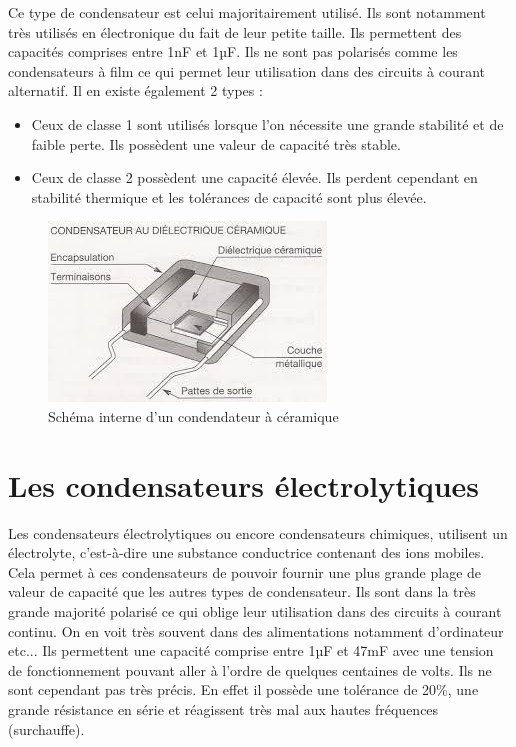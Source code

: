 Ce type de condensateur est celui majoritairement utilisé. Ils sont notamment très utilisés en électronique du fait de leur petite taille. Ils permettent des capacités comprises entre 1nF et 1µF. Ils ne sont pas polarisés comme les condensateurs à film ce qui permet leur utilisation dans des circuits à courant alternatif. Il en existe également 2 types :\\

\begin{itemize}
    \item Ceux de classe 1 sont utilisés lorsque l’on nécessite une grande stabilité et de faible perte. Ils possèdent une valeur de capacité très stable.\\
    \item Ceux de classe 2 possèdent une capacité élevée. Ils perdent cependant en stabilité thermique et les tolérances de capacité sont plus élevée.
\end{itemize}

\begin{figure}[!h]
    \centering
    \includegraphics[scale=1]{./picture4/condo_ceramique.jpg}
    \caption{Schéma interne d'un condendateur à céramique}
\end{figure}


\newpage
\section{Les condensateurs électrolytiques}

Les condensateurs électrolytiques ou encore condensateurs chimiques, utilisent un électrolyte, c’est-à-dire une substance conductrice contenant des ions mobiles. Cela permet à ces condensateurs de pouvoir fournir une plus grande plage de valeur de capacité que les autres types de condensateur. Ils sont dans la très grande majorité polarisé ce qui oblige leur utilisation dans des circuits à courant continu. On en voit très souvent dans des alimentations notamment d'ordinateur etc... Ils permettent une capacité comprise entre 1µF et 47mF avec une tension de fonctionnement pouvant aller à l’ordre de quelques centaines de volts. Ils ne sont cependant pas très précis. En effet il possède une tolérance de 20\%, une grande résistance en série et réagissent très mal aux hautes fréquences (surchauffe). 


